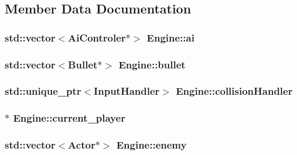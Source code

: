 \subsection{Member Data Documentation}
\hypertarget{class_engine_a82c1ca4ee6f6dd4e9b79918aa12c156f}{}
\subsubsection[{ai}]{\setlength{\rightskip}{0pt plus 5cm}std\+::vector$<${\bf Ai\+Controler}$\ast$$>$ Engine\+::ai}\label{class_engine_a82c1ca4ee6f6dd4e9b79918aa12c156f}
\hypertarget{class_engine_a267b13093cb4ea1de9c297a96b0314ea}{}
\subsubsection[{bullet}]{\setlength{\rightskip}{0pt plus 5cm}std\+::vector$<${\bf Bullet}$\ast$$>$ Engine\+::bullet}\label{class_engine_a267b13093cb4ea1de9c297a96b0314ea}
\hypertarget{class_engine_a20fca6041ee94486e4ed1ec48d63dfef}{}
\subsubsection[{collision\+Handler}]{\setlength{\rightskip}{0pt plus 5cm}std\+::unique\+\_\+ptr$<${\bf Input\+Handler}$>$ Engine\+::collision\+Handler\hspace{0.3cm}{\ttfamily [protected]}}\label{class_engine_a20fca6041ee94486e4ed1ec48d63dfef}
\hypertarget{class_engine_ab488c2946ac31376f272acc1eaf815b7}{}
\subsubsection[{current\+\_\+player}]{$\ast$ Engine\+::current\+\_\+player}\label{class_engine_ab488c2946ac31376f272acc1eaf815b7}
\hypertarget{class_engine_af5735da922e4f9fd64db49993dc8efe3}{}
\subsubsection[{enemy}]{\setlength{\rightskip}{0pt plus 5cm}std\+::vector$<${\bf Actor}$\ast$$>$ Engine\+::enemy}\label{class_engine_af5735da922e4f9fd64db49993dc8efe3}
\hypertarget{class_engine_ac38501b7527b3c8ce22f8b31a13821ea}{}
